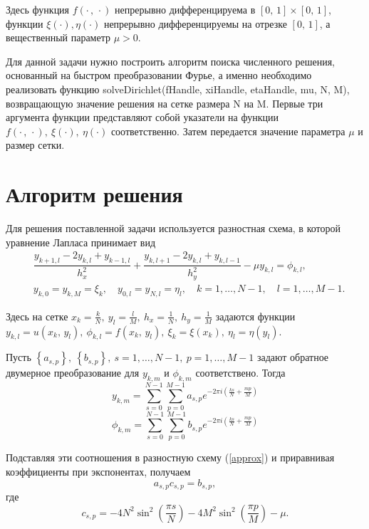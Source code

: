\documentclass[11pt]{article}
\begin{document}
Здесь функция $f\left(\cdot\, , \, \cdot\right)$ непрерывно дифференцируема в $\left[0, \, 1\right]
\times \left[0, \, 1\right]$, функции $\xi\left(\cdot\right), \eta\left(\cdot\right)$ 
непрерывно дифференцируемы на отрезке $\left[0, \, 1\right]$, а вещественный параметр $\mu > 0$.

Для данной задачи нужно построить алгоритм поиска численного решения, основанный
на быстром преобразовании Фурье, а именно необходимо реализовать функцию 
solveDirichlet(fHandle, xiHandle, etaHandle, mu, N, M), возвращающую значение решения на сетке размера N на M.
Первые три аргумента функции представляют собой указатели на функции $f\left(\cdot\, , \, \cdot\right), \ \xi\left(\cdot\right), \ \eta\left(\cdot\right)$ соответственно. Затем
передается значение параметра $\mu$ и размер сетки.

\newpage
\section{Алгоритм решения}
Для решения поставленной задачи используется разностная схема, в которой уравнение 
Лапласа принимает вид
\begin{equation} 
\begin{split}
&\dfrac{y_{k+1,l}-2y_{k,l}+y_{k-1,l}}{h_x^2} + 
\dfrac{y_{k,l+1}-2y_{k,l}+y_{k,l-1}}{h_y^2} - \mu y_{k,l} = \phi_{k,l}, \\ \label{approx}
&y_{k,0} = y_{k,M} = \xi_k, \quad y_{0,l} = y_{N,l} = \eta_l, \quad k = 1,\ldots,N-1, \quad l = 1,\ldots,M-1.
\end{split}
\end{equation}

Здесь на сетке $x_k = \frac{k}{N},\ y_l = \frac{l}{M},\ h_x=\frac{1}{N}, \ h_y=\frac{1}{M}$ задаются функции \\
$y_{k,l} = u\left(x_k, \, y_l\right),\ \phi_{k,l} = f\left(x_k, \, y_l\right), \
\xi_k = \xi\left(x_k\right),\ \eta_l = \eta\left(y_l\right).$

Пусть $\left\{a_{s,p}\right\}, \ \left\{b_{s,p}\right\}, \ s = 1,\ldots,N-1, \ p = 1,\ldots,M-1$ задают обратное двумерное преобразование для $y_{k,m}$ и $\phi_{k,m}$ соответствено. Тогда 
$$ y_{k,m}=\sum_{s=0}^{N-1}\sum_{p=0}^{M-1}a_{s,p}e^{-2\pi i \left(\frac{ks}{N} + \frac{mp}{M}\right)}$$
$$ \phi_{k,m}=\sum_{s=0}^{N-1}\sum_{p=0}^{M-1}b_{s,p}e^{-2\pi i \left(\frac{ks}{N} + \frac{mp}{M}\right)}$$

Подставляя эти соотношения в разностную схему (\ref{approx}) и приравнивая коэффициенты при экспонентах, получаем
\begin{equation}
a_{s,p}c_{s,p}= b_{s,p}, \label{ac=b}
\end{equation}
где $$c_{s,p} = -4N^2\sin^2\left(\frac{\pi s}{N}\right)-4M^2\sin^2\left(\frac{\pi p}{M}\right) - \mu.$$
\end{document}
